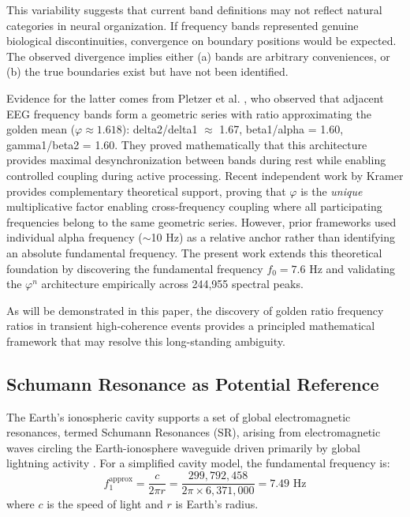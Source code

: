 \documentclass[11pt,a4paper]{article}
\newcommand{\phisym}{\varphi}
\begin{document}
This variability suggests that current band definitions may not reflect natural categories in neural organization. If frequency bands represented genuine biological discontinuities, convergence on boundary positions would be expected. The observed divergence implies either (a) bands are arbitrary conveniences, or (b) the true boundaries exist but have not been identified.

Evidence for the latter comes from Pletzer et al. \parencite{pletzer2010golden}, who observed that adjacent EEG frequency bands form a geometric series with ratio approximating the golden mean ($\phisym \approx 1.618$): delta2/delta1 $\approx$ 1.67, beta1/alpha = 1.60, gamma1/beta2 = 1.60. They proved mathematically that this architecture provides maximal desynchronization between bands during rest while enabling controlled coupling during active processing. Recent independent work by Kramer \parencite{kramer2022golden} provides complementary theoretical support, proving that $\phisym$ is the \textit{unique} multiplicative factor enabling cross-frequency coupling where all participating frequencies belong to the same geometric series. However, prior frameworks used individual alpha frequency ($\sim$10 Hz) as a relative anchor rather than identifying an absolute fundamental frequency. The present work extends this theoretical foundation by discovering the fundamental frequency $f_0 = 7.6$ Hz and validating the $\phisym^n$ architecture empirically across 244,955 spectral peaks.

As will be demonstrated in this paper, the discovery of golden ratio frequency ratios in transient high-coherence events provides a principled mathematical framework that may resolve this long-standing ambiguity.

\subsection{Schumann Resonance as Potential Reference}

The Earth's ionospheric cavity supports a set of global electromagnetic resonances, termed Schumann Resonances (SR), arising from electromagnetic waves circling the Earth-ionosphere waveguide driven primarily by global lightning activity \parencite{schumann1952strahlungslosen, nickolaenko2014schumann}. For a simplified cavity model, the fundamental frequency is:
\begin{equation}
f_1^{\text{approx}} = \frac{c}{2\pi r} = \frac{299,792,458}{2\pi \times 6,371,000} = 7.49 \text{ Hz}
\end{equation}
where $c$ is the speed of light and $r$ is Earth's radius.
\end{document}
